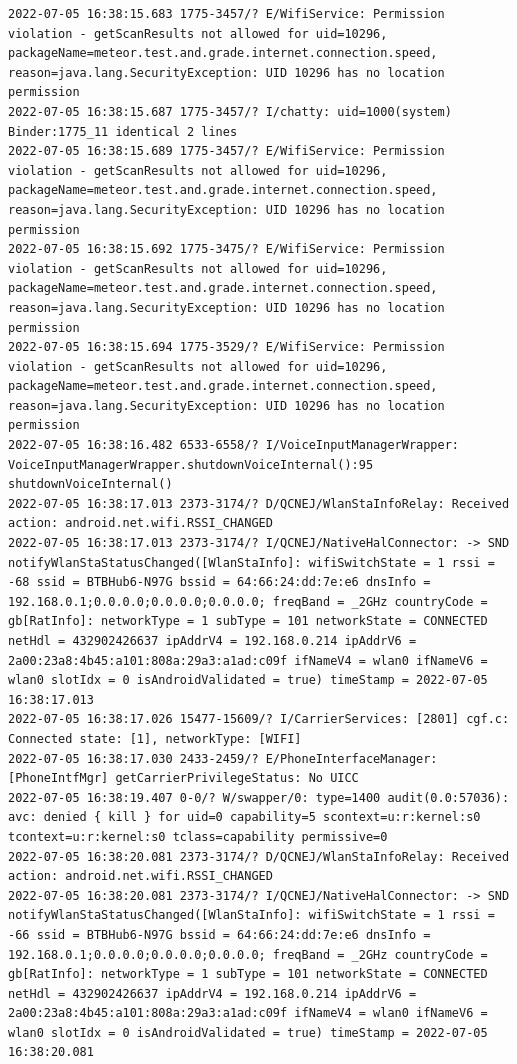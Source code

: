\documentclass[a4paper,12pt]{book}
\begin{document}
\begin{lstlisting}
2022-07-05 16:38:15.683 1775-3457/? E/WifiService: Permission violation - getScanResults not allowed for uid=10296, packageName=meteor.test.and.grade.internet.connection.speed, reason=java.lang.SecurityException: UID 10296 has no location permission
2022-07-05 16:38:15.687 1775-3457/? I/chatty: uid=1000(system) Binder:1775_11 identical 2 lines
2022-07-05 16:38:15.689 1775-3457/? E/WifiService: Permission violation - getScanResults not allowed for uid=10296, packageName=meteor.test.and.grade.internet.connection.speed, reason=java.lang.SecurityException: UID 10296 has no location permission
2022-07-05 16:38:15.692 1775-3475/? E/WifiService: Permission violation - getScanResults not allowed for uid=10296, packageName=meteor.test.and.grade.internet.connection.speed, reason=java.lang.SecurityException: UID 10296 has no location permission
2022-07-05 16:38:15.694 1775-3529/? E/WifiService: Permission violation - getScanResults not allowed for uid=10296, packageName=meteor.test.and.grade.internet.connection.speed, reason=java.lang.SecurityException: UID 10296 has no location permission
2022-07-05 16:38:16.482 6533-6558/? I/VoiceInputManagerWrapper: VoiceInputManagerWrapper.shutdownVoiceInternal():95 shutdownVoiceInternal()
2022-07-05 16:38:17.013 2373-3174/? D/QCNEJ/WlanStaInfoRelay: Received action: android.net.wifi.RSSI_CHANGED
2022-07-05 16:38:17.013 2373-3174/? I/QCNEJ/NativeHalConnector: -> SND notifyWlanStaStatusChanged([WlanStaInfo]: wifiSwitchState = 1 rssi = -68 ssid = BTBHub6-N97G bssid = 64:66:24:dd:7e:e6 dnsInfo = 192.168.0.1;0.0.0.0;0.0.0.0;0.0.0.0; freqBand = _2GHz countryCode = gb[RatInfo]: networkType = 1 subType = 101 networkState = CONNECTED netHdl = 432902426637 ipAddrV4 = 192.168.0.214 ipAddrV6 = 2a00:23a8:4b45:a101:808a:29a3:a1ad:c09f ifNameV4 = wlan0 ifNameV6 = wlan0 slotIdx = 0 isAndroidValidated = true) timeStamp = 2022-07-05 16:38:17.013
2022-07-05 16:38:17.026 15477-15609/? I/CarrierServices: [2801] cgf.c: Connected state: [1], networkType: [WIFI]
2022-07-05 16:38:17.030 2433-2459/? E/PhoneInterfaceManager: [PhoneIntfMgr] getCarrierPrivilegeStatus: No UICC
2022-07-05 16:38:19.407 0-0/? W/swapper/0: type=1400 audit(0.0:57036): avc: denied { kill } for uid=0 capability=5 scontext=u:r:kernel:s0 tcontext=u:r:kernel:s0 tclass=capability permissive=0
2022-07-05 16:38:20.081 2373-3174/? D/QCNEJ/WlanStaInfoRelay: Received action: android.net.wifi.RSSI_CHANGED
2022-07-05 16:38:20.081 2373-3174/? I/QCNEJ/NativeHalConnector: -> SND notifyWlanStaStatusChanged([WlanStaInfo]: wifiSwitchState = 1 rssi = -66 ssid = BTBHub6-N97G bssid = 64:66:24:dd:7e:e6 dnsInfo = 192.168.0.1;0.0.0.0;0.0.0.0;0.0.0.0; freqBand = _2GHz countryCode = gb[RatInfo]: networkType = 1 subType = 101 networkState = CONNECTED netHdl = 432902426637 ipAddrV4 = 192.168.0.214 ipAddrV6 = 2a00:23a8:4b45:a101:808a:29a3:a1ad:c09f ifNameV4 = wlan0 ifNameV6 = wlan0 slotIdx = 0 isAndroidValidated = true) timeStamp = 2022-07-05 16:38:20.081

\end{lstlisting}
\end{document}
